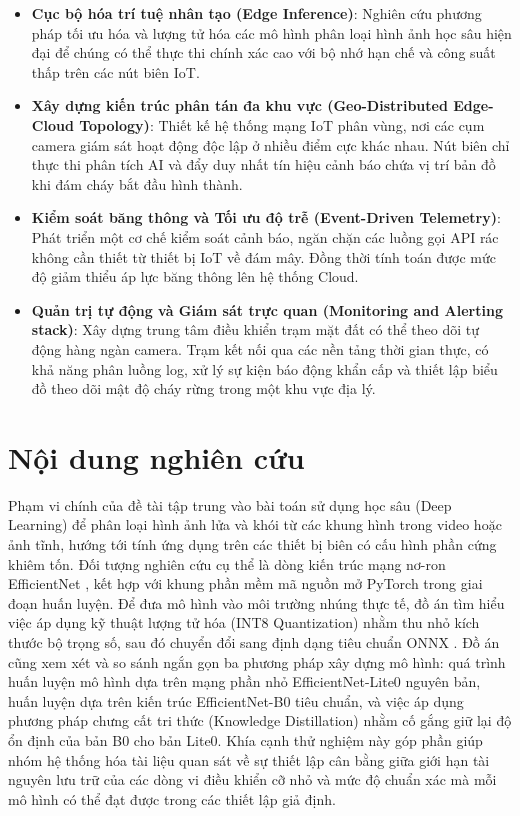 \documentclass[12pt,a4paper]{report}
\begin{document}
\begin{itemize}
  \item \textbf{Cục bộ hóa trí tuệ nhân tạo (Edge Inference)}: Nghiên cứu phương pháp tối ưu hóa và lượng tử hóa các mô hình phân loại hình ảnh học sâu hiện đại để chúng có thể thực thi chính xác cao với bộ nhớ hạn chế và công suất thấp trên các nút biên IoT.
  \item \textbf{Xây dựng kiến trúc phân tán đa khu vực (Geo-Distributed Edge-Cloud Topology)}: Thiết kế hệ thống mạng IoT phân vùng, nơi các cụm camera giám sát hoạt động độc lập ở nhiều điểm cực khác nhau. Nút biên chỉ thực thi phân tích AI và đẩy duy nhất tín hiệu cảnh báo chứa vị trí bản đồ khi đám cháy bắt đầu hình thành.
  \item \textbf{Kiểm soát băng thông và Tối ưu độ trễ (Event-Driven Telemetry)}: Phát triển một cơ chế kiểm soát cảnh báo, ngăn chặn các luồng gọi API rác không cần thiết từ thiết bị IoT về đám mây. Đồng thời tính toán được mức độ giảm thiểu áp lực băng thông lên hệ thống Cloud.
  \item \textbf{Quản trị tự động và Giám sát trực quan (Monitoring and Alerting stack)}: Xây dựng trung tâm điều khiển trạm mặt đất có thể theo dõi tự động hàng ngàn camera. Trạm kết nối qua các nền tảng thời gian thực, có khả năng phân luồng log, xử lý sự kiện báo động khẩn cấp và thiết lập biểu đồ theo dõi mật độ cháy rừng trong một khu vực địa lý.
\end{itemize}

\section{Nội dung nghiên cứu}

Phạm vi chính của đề tài tập trung vào bài toán sử dụng học sâu (Deep Learning) để phân loại hình ảnh lửa và khói từ các khung hình trong video hoặc ảnh tĩnh, hướng tới tính ứng dụng trên các thiết bị biên có cấu hình phần cứng khiêm tốn. Đối tượng nghiên cứu cụ thể là dòng kiến trúc mạng nơ-ron EfficientNet \cite{tan2019efficientnet}, kết hợp với khung phần mềm mã nguồn mở PyTorch trong giai đoạn huấn luyện. Để đưa mô hình vào môi trường nhúng thực tế, đồ án tìm hiểu việc áp dụng kỹ thuật lượng tử hóa (INT8 Quantization) nhằm thu nhỏ kích thước bộ trọng số, sau đó chuyển đổi sang định dạng tiêu chuẩn ONNX \cite{onnxruntime}. Đồ án cũng xem xét và so sánh ngắn gọn ba phương pháp xây dựng mô hình: quá trình huấn luyện mô hình dựa trên mạng phần nhỏ EfficientNet-Lite0 nguyên bản, huấn luyện dựa trên kiến trúc EfficientNet-B0 tiêu chuẩn, và việc áp dụng phương pháp chưng cất tri thức (Knowledge Distillation) \cite{hinton2015distilling, gou2021survey} nhằm cố gắng giữ lại độ ổn định của bản B0 cho bản Lite0. Khía cạnh thử nghiệm này góp phần giúp nhóm hệ thống hóa tài liệu quan sát về sự thiết lập cân bằng giữa giới hạn tài nguyên lưu trữ của các dòng vi điều khiển cỡ nhỏ và mức độ chuẩn xác mà mỗi mô hình có thể đạt được trong các thiết lập giả định.
\end{document}

